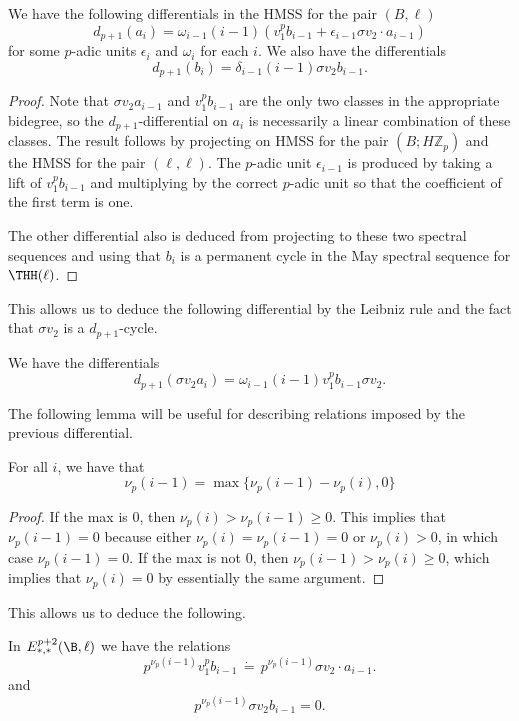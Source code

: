 \begin{prop}
	We have the following differentials in the HMSS for the pair $(B,\ell)$
	\[
	d_{p+1}(a_i) = \omega_{i-1} (i-1)(v_1^{p} b_{i-1} +\epsilon_{i-1}\sigma v_2 \cdot a_{i-1})
	\]
	for some $p$-adic units $\epsilon_i$ and $\omega_i$ for each $i$. 
	We also have the differentials
	\[
	d_{p+1}(b_i) = \delta_{i-1}(i-1)\sigma v_2 b_{i-1}.
	\] 
\end{prop}
\begin{proof}
	Note that $\sigma v_2 a_{i-1}$ and $v_1^p b_{i-1}$ are the only two classes in the appropriate bidegree, so the $d_{p+1}$-differential on $a_i$ is necessarily a linear combination of these classes. The result follows by projecting on HMSS for the pair $(B;H\mathbb{Z}_p)$ and the HMSS for the pair $(\ell,\ell)$. The $p$-adic unit $\epsilon_{i-1}$ is produced by taking a lift of $v_1^pb_{i-1}$ and multiplying by the correct $p$-adic unit so that the coefficient of the first term is one. 
	
	
	The other differential also is deduced from projecting to these two spectral sequences and using that $b_i$ is a permanent cycle in the May spectral sequence for $\THH(\ell)$.
\end{proof}

This allows us to deduce the following differential by the Leibniz rule and the fact that $\sigma v_2$ is a $d_{p+1}$-cycle.

\begin{cor}
	We have the differentials
	\[
	d_{p+1}(\sigma v_2 a_{i}) = \omega_{i-1}(i-1)v_1^pb_{i-1}\sigma v_2.
	\]
\end{cor}

The  following lemma will be useful for describing relations imposed by the previous differential.
\begin{lem}
	For all $i$, we have that 
	\[
	\nu_p(i-1) = \max\{\nu_p(i-1)-\nu_p(i), 0\}
	\]
\end{lem}
\begin{proof}
	If the max is 0, then $\nu_p(i)>\nu_{p}(i-1)\geq 0$. This implies that $\nu_p(i-1)=0$ because either $\nu_p(i)=\nu_p(i-1)=0$ or $\nu_p(i)>0$, in which case $\nu_p(i-1)=0$. If the max is not 0, then $\nu_p(i-1)>\nu_p(i)\geq 0$, which implies that $\nu_p(i)=0$ by essentially the same argument.
\end{proof}

This allows us to deduce the following. 

\begin{cor}
	In $E_{*,*}^{p+2}(\B,\ell)$ we have the relations
	\[
	p^{\nu_p(i-1)}v_1^pb_{i-1}\,\dot{=}\,p^{\nu_p(i-1)}\sigma v_2\cdot a_{i-1}.
	\]
	and 
	\[
	p^{\nu_p(i-1)}\sigma v_2 b_{i-1}=0.
	\]
\end{cor}

